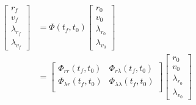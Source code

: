 \documentclass[conf]{new-aiaa}
\begin{document}
\begin{singlespace}
\begin{align}
    \begin{bmatrix}
        r_f \\ v_f \\ \lambda_{r_f} \\ \lambda_{v_f}
    \end{bmatrix}
    & =
    \Phi(t_f,t_0)
    \begin{bmatrix}
        r_0 \\ v_0 \\ \lambda_{r_0} \\ \lambda_{v_0}
    \end{bmatrix} \\
    & =
    \begin{bmatrix}
        \Phi_{rr}(t_f,t_0) & \Phi_{r\lambda}(t_f,t_0) \\
        \Phi_{\lambda r}(t_f,t_0) & \Phi_{\lambda\lambda}(t_f,t_0) \\
    \end{bmatrix}
    \begin{bmatrix}
        r_0 \\ v_0 \\ \lambda_{r_0} \\ \lambda_{v_0}
    \end{bmatrix}
\end{align}


\end{singlespace}
\end{document}
